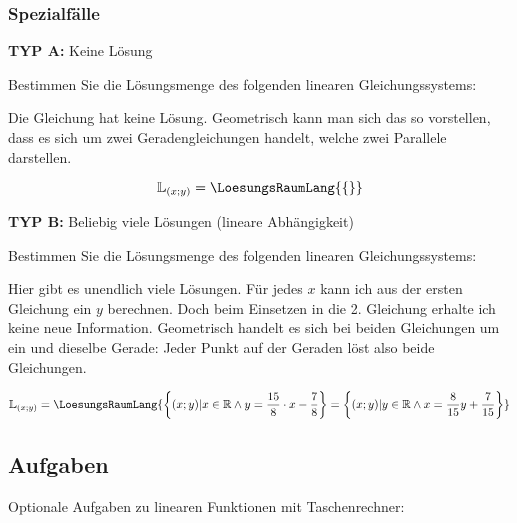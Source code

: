 \subsubsection{Spezialfälle}
\textbf{TYP A:} Keine Lösung

Bestimmen Sie die Lösungsmenge des folgenden linearen Gleichungssystems:


Die Gleichung hat keine Lösung. Geometrisch kann man sich das so vorstellen, dass es sich um zwei Geradengleichungen handelt, welche zwei Parallele darstellen.

$$\mathbb{L}_{(x;y)} = \LoesungsRaumLang{\{\}}$$

\textbf{TYP B:} Beliebig viele Lösungen (lineare Abhängigkeit)

Bestimmen Sie die Lösungsmenge des folgenden linearen Gleichungssystems:


Hier gibt es unendlich viele Lösungen. Für jedes $x$ kann ich aus der ersten Gleichung ein $y$ berechnen. Doch beim Einsetzen in die 2. Gleichung erhalte ich keine neue Information.
Geometrisch handelt es sich bei beiden Gleichungen um ein und dieselbe Gerade: Jeder Punkt auf der Geraden löst also beide Gleichungen.

$$\mathbb{L}_{(x;y)} = \LoesungsRaumLang{
\left\{(x;y)| x\in \mathbb{R} \land{} y = \frac{15}{8} \cdot{} x - \frac78\right\} =
\left\{(x;y)| y\in \mathbb{R} \land{} x = \frac8{15}y + \frac7{15}\right\}}$$

\newpage


\subsection*{Aufgaben}

Optionale Aufgaben zu linearen Funktionen mit Taschenrechner:

\newpage
